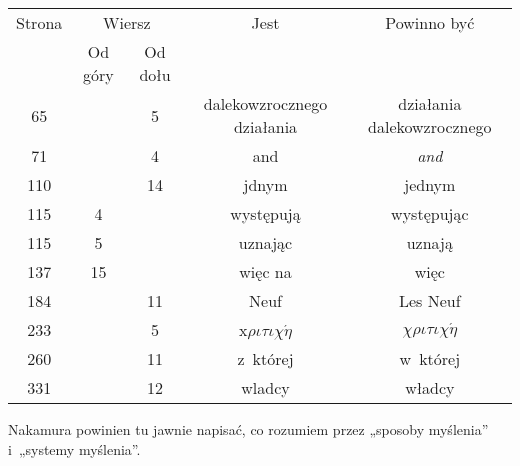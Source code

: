\documentclass[a4paper,11pt]{article}
\begin{document}
\begin{center}

  \begin{tabular}{|c|c|c|c|c|}
    \hline
    Strona & \multicolumn{2}{c|}{Wiersz} & Jest
                              & Powinno być \\ \cline{2-3}
    & Od góry & Od dołu & & \\
    \hline
    65  & &  5 & dalekowzrocznego działania & działania dalekowzrocznego \\
    71  & &  4 & and & \textit{and} \\
    110 & & 14 & jdnym & jednym \\
    115 &  4 & & występują & występując \\
    115 &  5 & & uznając & uznają \\
    137 & 15 & & więc na & więc \\
    184 & & 11 & Neuf & Les Neuf \\
    233 & &  5 & x$\rho\iota\tau\iota\chi\acute{\eta}$ & $\chi\rho\iota\tau\iota\chi\acute{\eta}$ \\
    260 & & 11 & z~której & w~której \\
    331 & & 12 & wladcy & władcy \\
    \hline
  \end{tabular}

\end{center}

\vspace{\spaceTwo}













\newpage


\vspace{0em}



\vspace{0em}


\noindent
{} Nakamura powinien tu jawnie napisać, co rozumiem przez
„sposoby myślenia” i~„systemy myślenia”.
\end{document}
